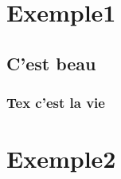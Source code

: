 \documentclass[12pt,twoside]{scrartcl}
\date{Avril 2016}
\author{Direction des opérations}
\begin{document}
\initIngeniance


% 

\tableofcontents

\chapter{Exemple1}
\section{C'est beau}
\subsection{Tex c'est la vie}
\chapter{Exemple2}
%

% 










\end{document}
